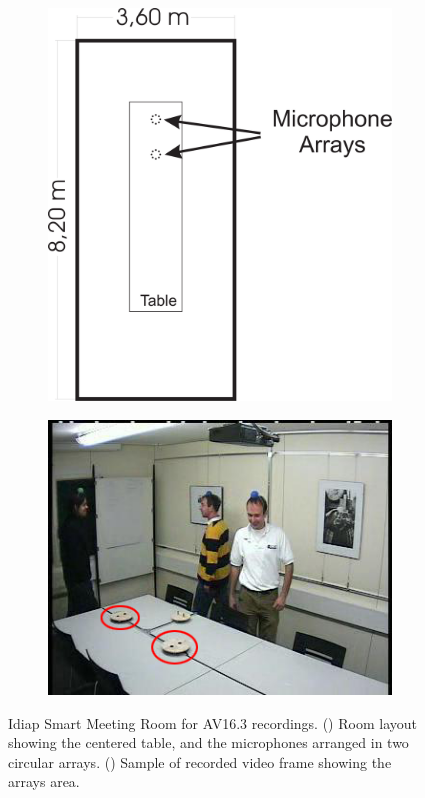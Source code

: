 \documentclass[spanish,openright]{book}
\begin{document}
\begin{figure}
  \centering
  \begin{subfigure}[b]{0.30\textwidth}
    \includegraphics[width=\textwidth]{roomlayout2}
    \caption{}
    \label{fig:RoomLayout}
  \end{subfigure}\qquad \qquad \begin{subfigure}[b]{0.425\textwidth}
    \includegraphics[width=\textwidth]{idiap-seq45-cam2.jpg}
    \caption{}
    \label{fig:RoomPicture}
  \end{subfigure}
  \caption{Idiap Smart Meeting Room for AV16.3 recordings.
    (\protect{}) Room layout showing the centered
    table, and the microphones arranged in two circular arrays.
    (\protect{}) Sample of recorded video frame
    showing the arrays area. \vspace{-0.3cm}}
  \label{fig:LIdiapRoom}
\end{figure}
\end{document}
